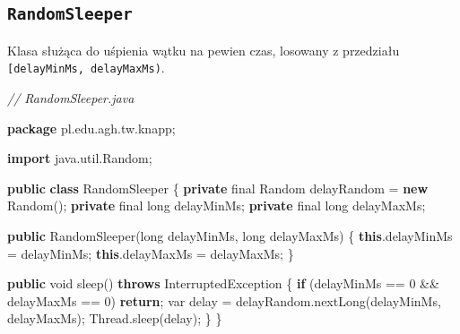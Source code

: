 \documentclass[11pt]{article}
\newenvironment{Shaded}{}{}
\newcommand{\KeywordTok}[1]{\textcolor[rgb]{0.00,0.44,0.13}{\textbf{{#1}}}}
\newcommand{\DataTypeTok}[1]{\textcolor[rgb]{0.56,0.13,0.00}{{#1}}}
\newcommand{\DecValTok}[1]{\textcolor[rgb]{0.25,0.63,0.44}{{#1}}}
\newcommand{\CommentTok}[1]{\textcolor[rgb]{0.38,0.63,0.69}{\textit{{#1}}}}
\newcommand{\FunctionTok}[1]{\textcolor[rgb]{0.02,0.16,0.49}{{#1}}}
\newcommand{\NormalTok}[1]{{#1}}
\newcommand{\ImportTok}[1]{{#1}}
\newcommand{\ControlFlowTok}[1]{\textcolor[rgb]{0.00,0.44,0.13}{\textbf{{#1}}}}
\newcommand{\OperatorTok}[1]{\textcolor[rgb]{0.40,0.40,0.40}{{#1}}}
\newcommand{\BuiltInTok}[1]{{#1}}
\begin{document}
    \hypertarget{randomsleeper}{%
\subsection{\texorpdfstring{\texttt{RandomSleeper}}{RandomSleeper}}\label{randomsleeper}}

Klasa służąca do uśpienia wątku na pewien czas, losowany z przedziału
\texttt{{[}delayMinMs,\ delayMaxMs)}.

\begin{Shaded}
\begin{Highlighting}[]
\CommentTok{// RandomSleeper.java}

\KeywordTok{package}\ImportTok{ pl}\OperatorTok{.}\ImportTok{edu}\OperatorTok{.}\ImportTok{agh}\OperatorTok{.}\ImportTok{tw}\OperatorTok{.}\ImportTok{knapp}\OperatorTok{;}

\KeywordTok{import} \ImportTok{java}\OperatorTok{.}\ImportTok{util}\OperatorTok{.}\ImportTok{Random}\OperatorTok{;}

\KeywordTok{public} \KeywordTok{class}\NormalTok{ RandomSleeper }\OperatorTok{\{}
    \KeywordTok{private} \DataTypeTok{final} \BuiltInTok{Random}\NormalTok{ delayRandom }\OperatorTok{=} \KeywordTok{new} \BuiltInTok{Random}\OperatorTok{();}
    \KeywordTok{private} \DataTypeTok{final} \DataTypeTok{long}\NormalTok{ delayMinMs}\OperatorTok{;}
    \KeywordTok{private} \DataTypeTok{final} \DataTypeTok{long}\NormalTok{ delayMaxMs}\OperatorTok{;}

    \KeywordTok{public} \FunctionTok{RandomSleeper}\OperatorTok{(}\DataTypeTok{long}\NormalTok{ delayMinMs}\OperatorTok{,} \DataTypeTok{long}\NormalTok{ delayMaxMs}\OperatorTok{)} \OperatorTok{\{}
        \KeywordTok{this}\OperatorTok{.}\FunctionTok{delayMinMs} \OperatorTok{=}\NormalTok{ delayMinMs}\OperatorTok{;}
        \KeywordTok{this}\OperatorTok{.}\FunctionTok{delayMaxMs} \OperatorTok{=}\NormalTok{ delayMaxMs}\OperatorTok{;}
    \OperatorTok{\}}

    \KeywordTok{public} \DataTypeTok{void} \FunctionTok{sleep}\OperatorTok{()} \KeywordTok{throws} \BuiltInTok{InterruptedException} \OperatorTok{\{}
        \ControlFlowTok{if} \OperatorTok{(}\NormalTok{delayMinMs }\OperatorTok{==} \DecValTok{0} \OperatorTok{\&\&}\NormalTok{ delayMaxMs }\OperatorTok{==} \DecValTok{0}\OperatorTok{)}
            \ControlFlowTok{return}\OperatorTok{;}
        \DataTypeTok{var}\NormalTok{ delay }\OperatorTok{=}\NormalTok{ delayRandom}\OperatorTok{.}\FunctionTok{nextLong}\OperatorTok{(}\NormalTok{delayMinMs}\OperatorTok{,}\NormalTok{ delayMaxMs}\OperatorTok{);}
        \BuiltInTok{Thread}\OperatorTok{.}\FunctionTok{sleep}\OperatorTok{(}\NormalTok{delay}\OperatorTok{);}
    \OperatorTok{\}}
\OperatorTok{\}}
\end{Highlighting}
\end{Shaded}
\end{document}
